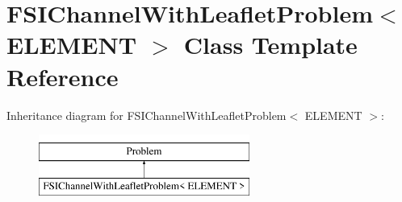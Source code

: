 \hypertarget{classFSIChannelWithLeafletProblem}{}\section{F\+S\+I\+Channel\+With\+Leaflet\+Problem$<$ E\+L\+E\+M\+E\+NT $>$ Class Template Reference}
\label{classFSIChannelWithLeafletProblem}
Inheritance diagram for F\+S\+I\+Channel\+With\+Leaflet\+Problem$<$ E\+L\+E\+M\+E\+NT $>$\+:\begin{figure}[H]
\begin{center}
\leavevmode
\includegraphics[height=2.000000cm]{classFSIChannelWithLeafletProblem}
\end{center}
\end{figure}
